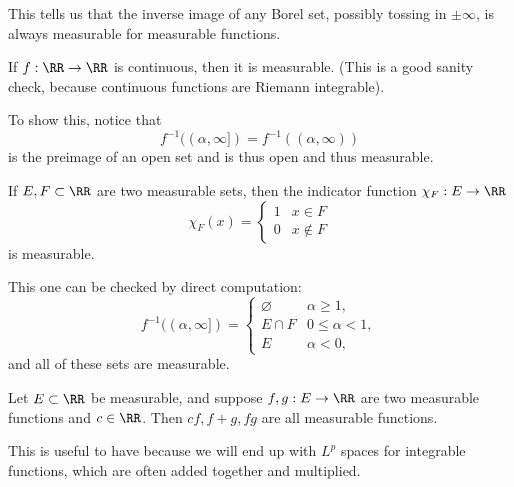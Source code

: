 This tells us that the inverse image of any Borel set, possibly tossing in $\pm \infty$, is always measurable for measurable functions. 

\begin{example}\label{contimplmeas}
If $f: \RR \to \RR$ is continuous, then it is measurable. (This is a good sanity check, because continuous functions are Riemann integrable).  
\end{example}

To show this, notice that 
\[
    f^{-1}((\alpha, \infty]) = f^{-1}((\alpha, \infty))
\]
is the preimage of an open set and is thus open and thus measurable.

\begin{example}
If $E, F \subset \RR$ are two measurable sets, then the indicator function $\chi_F: E \to \RR$
\[
    \chi_F(x) = \begin{cases} 1 & x \in F \\ 0 & x \not\in F \end{cases}
\]
is measurable.
\end{example}

This one can be checked by direct computation: 
\[
    f^{-1}((\alpha, \infty]) = \begin{cases} \varnothing & \alpha \ge 1, \\ E \cap F & 0 \le \alpha < 1, \\ E & \alpha < 0,\end{cases}
\]
and all of these sets are measurable. 

\begin{theorem}
Let $E \subset \RR$ be measurable, and suppose $f, g: E \to \RR$ are two measurable functions and $c \in \RR$. Then $cf, f+g, fg$ are all measurable functions.
\end{theorem}

This is useful to have because we will end up with $L^p$ spaces for integrable functions, which are often added together and multiplied.

